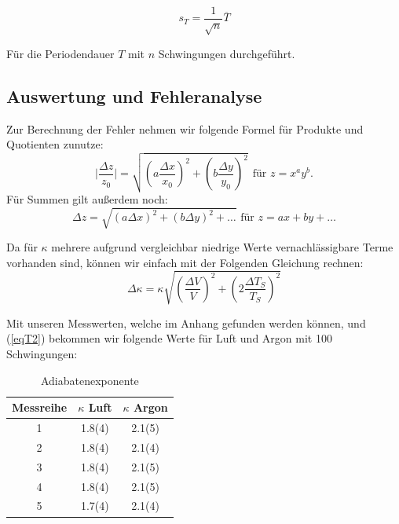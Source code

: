 \documentclass[11pt,a4paper]{article}
\begin{document}
\begin{equation}
s_T=\frac{1}{\sqrt{n}}\overline{T}\label{equt}
\end{equation}

F\"ur die Periodendauer $T$ mit $n$ Schwingungen durchgef\"uhrt.

\subsection{Auswertung und Fehleranalyse}

%

Zur Berechnung der Fehler nehmen wir folgende Formel f\"ur Produkte  und Quotienten zunutze:
\begin{equation}
\vert\frac{\Delta z}{z_0}\vert = \sqrt{\left({a\frac{\Delta x}{x_0}}\right)^2+\left({b\frac{\Delta y}{y_0}}\right)^2} \ \ \textrm{f\"ur } z=x^a y^b. 
\end{equation}
F\"ur Summen gilt au\ss erdem noch:
\begin{equation}
\Delta z = \sqrt{(a\Delta x)^2 + (b \Delta y)^2+\ldots} \textrm{  f\"ur } z = ax+by+\ldots
\end{equation}


Da f\"ur $\kappa$ mehrere aufgrund vergleichbar niedrige Werte vernachl\"assigbare Terme vorhanden sind, k\"onnen wir einfach mit der Folgenden Gleichung rechnen:
$$ \Delta \kappa  = \kappa \sqrt{\left({\frac{\Delta V}{V}}\right)^2 + \left({2\frac{\Delta T_S}{T_S}}\right)^2} $$

Mit unseren Messwerten, welche im Anhang gefunden werden k\"onnen, und (\ref{eqT2}) bekommen wir folgende Werte f\"ur Luft und Argon mit 100 Schwingungen:

\begin{table}[h]
\centering
\renewcommand\thetable{T1}
\caption{Adiabatenexponente}
\vspace{11pt}
\begin{tabular}{ccc}
\toprule
Messreihe & $\kappa$ Luft &  $\kappa$ Argon\\
\midrule
1 & 1.8(4) & 2.1(5)\\
2 & 1.8(4) & 2.1(4)\\
3 & 1.8(4) & 2.1(5)\\
4 & 1.8(4) & 2.1(5)\\
5 & 1.7(4) & 2.1(4)\\
\bottomrule 
\end{tabular}
\label{tab:B1}
\end{table}
\end{document}
